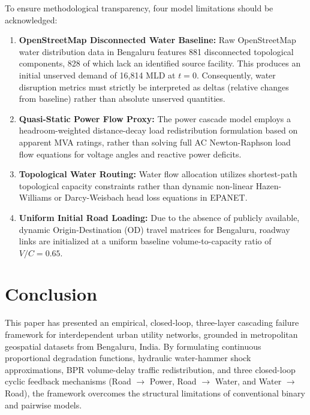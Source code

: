 \documentclass[oneside]{ieeeaccess}
\begin{document}
To ensure methodological transparency, four model limitations should be acknowledged:
\begin{enumerate}
    \item \textbf{OpenStreetMap Disconnected Water Baseline:} Raw OpenStreetMap water distribution data in Bengaluru features 881 disconnected topological components, 828 of which lack an identified source facility. This produces an initial unserved demand of 16,814 MLD at $t=0$. Consequently, water disruption metrics must strictly be interpreted as deltas (relative changes from baseline) rather than absolute unserved quantities.
    \item \textbf{Quasi-Static Power Flow Proxy:} The power cascade model employs a headroom-weighted distance-decay load redistribution formulation based on apparent MVA ratings, rather than solving full AC Newton-Raphson load flow equations for voltage angles and reactive power deficits.
    \item \textbf{Topological Water Routing:} Water flow allocation utilizes shortest-path topological capacity constraints rather than dynamic non-linear Hazen-Williams or Darcy-Weisbach head loss equations in EPANET.
    \item \textbf{Uniform Initial Road Loading:} Due to the absence of publicly available, dynamic Origin-Destination (OD) travel matrices for Bengaluru, roadway links are initialized at a uniform baseline volume-to-capacity ratio of $V/C = 0.65$.
\end{enumerate}

\section{Conclusion}
\label{sec:conclusion}

This paper has presented an empirical, closed-loop, three-layer cascading failure framework for interdependent urban utility networks, grounded in metropolitan geospatial datasets from Bengaluru, India. By formulating continuous proportional degradation functions, hydraulic water-hammer shock approximations, BPR volume-delay traffic redistribution, and three closed-loop cyclic feedback mechanisms (Road $\rightarrow$ Power, Road $\rightarrow$ Water, and Water $\rightarrow$ Road), the framework overcomes the structural limitations of conventional binary and pairwise models.
\end{document}
